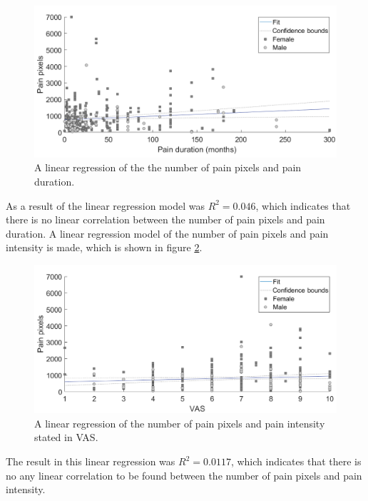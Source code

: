 \begin{figure} [H]
\centering
\includegraphics[width=1\textwidth]{figures/durapixel}
\caption{A linear regression of the the number of pain pixels and pain duration.}
\label{fig:durapixel}
\end{figure}

\noindent
As a result of the linear regression model was $R^2=0.046$, which indicates that there is no linear correlation between the number of pain pixels and pain duration.\newline
\noindent
A linear regression model of the number of pain pixels and pain intensity is made, which is shown in figure \ref{fig:painRegression}. \newline

\begin{figure} [H]
\centering
\includegraphics[width=1\textwidth]{figures/vaspixel}
\caption{A linear regression of the number of pain pixels and pain intensity stated in VAS.}
\label{fig:painRegression}
\end{figure}

\noindent
The result in this linear regression was $R^2=0.0117$, which indicates that there is no any linear correlation to be found between the number of pain pixels and pain intensity.\newline

